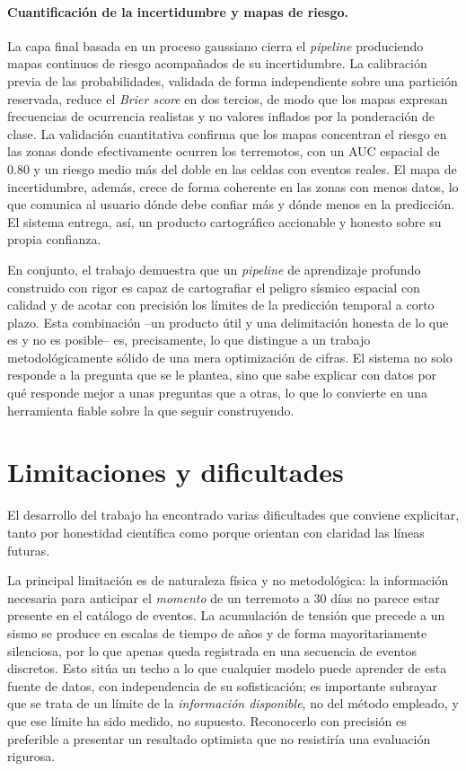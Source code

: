 \paragraph{Cuantificación de la incertidumbre y mapas de riesgo.} La capa final basada en un
proceso gaussiano cierra el \textit{pipeline} produciendo mapas continuos de riesgo acompañados
de su incertidumbre. La calibración previa de las probabilidades, validada de forma
independiente sobre una partición reservada, reduce el \textit{Brier score} en dos tercios, de
modo que los mapas expresan frecuencias de ocurrencia realistas y no valores inflados por la
ponderación de clase. La validación cuantitativa confirma que los mapas concentran el riesgo en
las zonas donde efectivamente ocurren los terremotos, con un AUC espacial de 0.80 y un riesgo
medio más del doble en las celdas con eventos reales. El mapa de incertidumbre, además, crece de
forma coherente en las zonas con menos datos, lo que comunica al usuario dónde debe confiar más
y dónde menos en la predicción. El sistema entrega, así, un producto cartográfico accionable y
honesto sobre su propia confianza.

\medskip
En conjunto, el trabajo demuestra que un \textit{pipeline} de aprendizaje profundo construido
con rigor es capaz de cartografiar el peligro sísmico espacial con calidad y de acotar con
precisión los límites de la predicción temporal a corto plazo. Esta combinación --un producto
útil y una delimitación honesta de lo que es y no es posible-- es, precisamente, lo que
distingue a un trabajo metodológicamente sólido de una mera optimización de cifras. El sistema
no solo responde a la pregunta que se le plantea, sino que sabe explicar con datos por qué
responde mejor a unas preguntas que a otras, lo que lo convierte en una herramienta fiable
sobre la que seguir construyendo.

\section{Limitaciones y dificultades}
\label{limitaciones}

El desarrollo del trabajo ha encontrado varias dificultades que conviene explicitar, tanto por
honestidad científica como porque orientan con claridad las líneas futuras.

La principal limitación es de naturaleza física y no metodológica: la información necesaria para
anticipar el \emph{momento} de un terremoto a 30 días no parece estar presente en el catálogo de
eventos. La acumulación de tensión que precede a un sismo se produce en escalas de tiempo de
años y de forma mayoritariamente silenciosa, por lo que apenas queda registrada en una secuencia
de eventos discretos. Esto sitúa un techo a lo que cualquier modelo puede aprender de esta fuente
de datos, con independencia de su sofisticación; es importante subrayar que se trata de un límite
de la \emph{información disponible}, no del método empleado, y que ese límite ha sido medido, no
supuesto. Reconocerlo con precisión es preferible a presentar un resultado optimista que no
resistiría una evaluación rigurosa.

